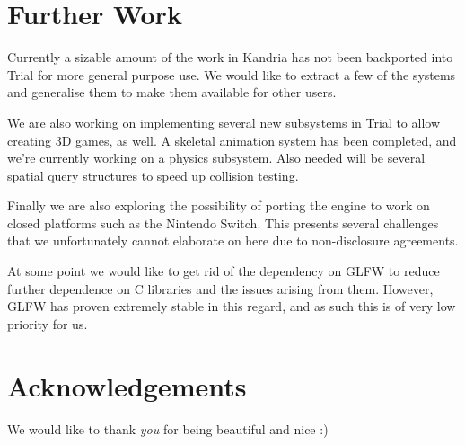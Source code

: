 \documentclass[format=sigconf]{acmart}
\begin{document}
\section{Further Work}\label{further-work}
Currently a sizable amount of the work in Kandria has not been backported into Trial for more general purpose use. We would like to extract a few of the systems and generalise them to make them available for other users.

We are also working on implementing several new subsystems in Trial to allow creating 3D games, as well. A skeletal animation system has been completed, and we're currently working on a physics subsystem. Also needed will be several spatial query structures to speed up collision testing.

Finally we are also exploring the possibility of porting the engine to work on closed platforms such as the Nintendo Switch. This presents several challenges that we unfortunately cannot elaborate on here due to non-disclosure agreements.

At some point we would like to get rid of the dependency on GLFW to reduce further dependence on C libraries and the issues arising from them. However, GLFW has proven extremely stable in this regard, and as such this is of very low priority for us.

\section{Acknowledgements}\label{acknowledgements}
We would like to thank \textit{you} for being beautiful and nice :)

\end{document}

